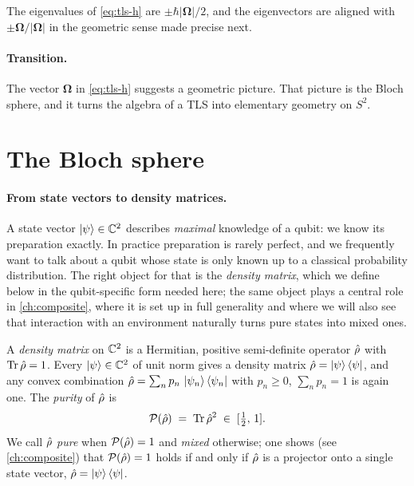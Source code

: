 The eigenvalues of \cref{eq:tls-h} are $\pm\hbar|\bm{\Omega}|/2$, and the
eigenvectors are aligned with $\pm\bm{\Omega}/|\bm{\Omega}|$ in the geometric
sense made precise next.

\paragraph{Transition.}
The vector $\bm{\Omega}$ in \cref{eq:tls-h} suggests a geometric
picture. That picture is the Bloch sphere, and it turns the algebra
of a TLS into elementary geometry on $S^2$.

\section{The Bloch sphere}
\label{sec:bloch}

\paragraph{From state vectors to density matrices.}
A state vector $\ket{\psi}\in\mathbb{C}^2$ describes \emph{maximal}
knowledge of a qubit: we know its preparation exactly. In practice
preparation is rarely perfect, and we frequently want to talk about
a qubit whose state is only known up to a classical probability
distribution. The right object for that is the \emph{density
matrix}, which we define below in the qubit-specific form needed
here; the same object plays a central role in \cref{ch:composite},
where it is set up in full generality and where we will also see
that interaction with an environment naturally turns pure states
into mixed ones.

\begin{definition}
\label{def:density-tls}
A \emph{density matrix} on $\mathbb{C}^2$ is a Hermitian, positive
semi-definite operator $\hat{\rho}$ with $\operatorname{Tr}\hat{\rho}=1$. Every
$\ket{\psi}\in\mathbb{C}^2$ of unit norm gives a density matrix
$\hat{\rho}=\ket{\psi}\bra{\psi}$, and any convex combination
$\hat{\rho}=\sum_n p_n\,\ket{\psi_n}\bra{\psi_n}$ with $p_n\geq0$,
$\sum_n p_n=1$ is again one. The \emph{purity} of $\hat{\rho}$ is
\begin{equation}
\mathcal{P}(\hat{\rho}) \;=\; \operatorname{Tr}\hat{\rho}^2 \;\in\; [\tfrac12,\,1].
\end{equation}
We call $\hat{\rho}$ \emph{pure} when
$\mathcal{P}(\hat{\rho})=1$ and \emph{mixed} otherwise; one shows
(see \cref{ch:composite}) that
$\mathcal{P}(\hat{\rho})=1$ holds if and only if $\hat{\rho}$ is a
projector onto a single state vector,
$\hat{\rho}=\ket{\psi}\bra{\psi}$.
\end{definition}

